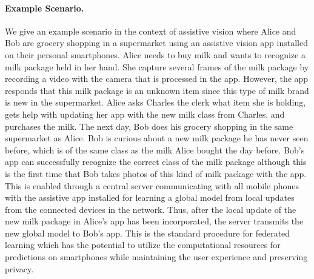 \vspace{-3mm}
\paragraph{Example Scenario.} We give an example scenario in the context of assistive vision where Alice and Bob are grocery shopping in a supermarket using an assistive vision app installed on their personal smartphones. Alice needs to buy milk and wants to recognize a milk package held in her hand. She capture several frames of the milk package by recording a video with the camera that is processed in the app. However, the app responds that this milk package is an unknown item since this type of milk brand is new in the supermarket. Alice asks Charles the clerk what item she is holding, gets help with updating her app with the new milk class from Charles, and purchases the milk. The next day, Bob does his grocery shopping in the same supermarket as Alice. Bob is curious about a new milk package he has never seen before, which is of the same class as the milk Alice bought the day before. 
Bob's app can successfully recognize the correct class of the milk package although this is the first time that Bob takes photos of this kind of milk package with the app. This is enabled through a central server communicating with all mobile phones with the assistive app installed for learning a global model from local updates from the connected devices in the network. Thus, after the local update of the new milk package in Alice's app has been incorporated, the server transmits the new global model to Bob's app. This is the standard procedure for federated learning which has the potential to utilize the computational resources for predictions on smartphones while maintaining the user experience and preserving privacy. 

